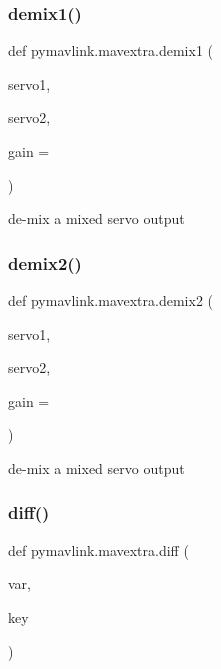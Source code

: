 \subsubsection{\texorpdfstring{demix1()}{demix1()}}
{\footnotesize\ttfamily def pymavlink.\+mavextra.\+demix1 (\begin{DoxyParamCaption}\item[{}]{servo1,  }\item[{}]{servo2,  }\item[{}]{gain = {} }\end{DoxyParamCaption})}

\begin{DoxyVerb}de-mix a mixed servo output\end{DoxyVerb}
 \mbox{\label{namespacepymavlink_1_1mavextra_acb35268957b8dd904a70309763ab2c95}} 
\subsubsection{\texorpdfstring{demix2()}{demix2()}}
{\footnotesize\ttfamily def pymavlink.\+mavextra.\+demix2 (\begin{DoxyParamCaption}\item[{}]{servo1,  }\item[{}]{servo2,  }\item[{}]{gain = {} }\end{DoxyParamCaption})}

\begin{DoxyVerb}de-mix a mixed servo output\end{DoxyVerb}
 \mbox{\label{namespacepymavlink_1_1mavextra_ab3215121238bdf76cb714ad349d6a17b}} 
\subsubsection{\texorpdfstring{diff()}{diff()}}
{\footnotesize\ttfamily def pymavlink.\+mavextra.\+diff (\begin{DoxyParamCaption}\item[{}]{var,  }\item[{}]{key }\end{DoxyParamCaption})}

